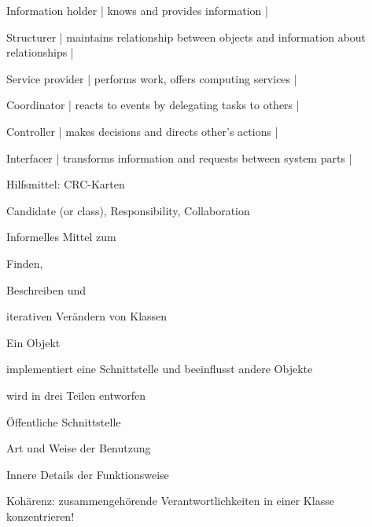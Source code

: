 \documentclass[a4paper]{article}
\begin{document}
\begin{multicols}{3}
  \begin{itemize*}
    \item Information holder  | knows and provides information |
    \item Structurer | maintains relationship between objects and information about relationships |
    \item Service provider | performs work, offers computing services |
    \item Coordinator | reacts to events by delegating tasks to others |
    \item Controller | makes decisions and directs other’s actions |
    \item Interfacer | transforms information and requests between system parts |
  \end{itemize*}

  Hilfsmittel: CRC-Karten
  \begin{itemize*}
    \item Candidate (or class), Responsibility, Collaboration
    \item Informelles Mittel zum
    \begin{itemize*}
      \item Finden,
      \item Beschreiben und
      \item iterativen Verändern von Klassen
    \end{itemize*}
  \end{itemize*}

  Ein Objekt
  \begin{itemize*}
    \item implementiert eine Schnittstelle und beeinflusst andere Objekte
    \item wird in drei Teilen entworfen
    \begin{itemize*}
      \item Öffentliche Schnittstelle
      \item Art und Weise der Benutzung
      \item Innere Details der Funktionsweise
    \end{itemize*}
    \item Kohärenz: zusammengehörende Verantwortlichkeiten in einer Klasse konzentrieren!
  \end{itemize*}



\end{multicols}
\end{document}
